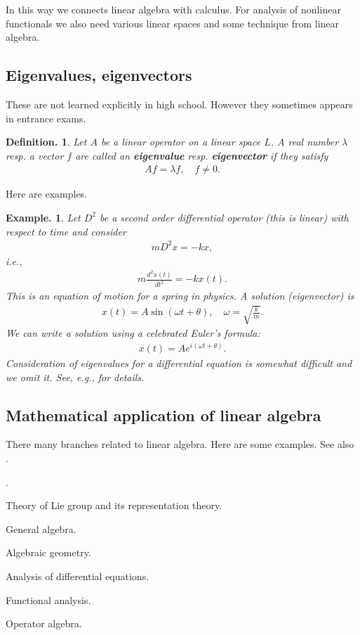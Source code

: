 \documentclass[openany, a4paper, oneside]{jsbook}
\newcounter{enum2}
\renewenvironment{enumerate}{%
\begin{list}%
{%
\arabic{enum2}.\ \,%
}%
{%
\usecounter{enum2}
\setlength{\itemindent}{0pt}%
\setlength{\leftmargin}{15pt}%
\setlength{\rightmargin}{0pt}%
\setlength{\labelsep}{0pt}%
\setlength{\labelwidth}{6pt}%
\setlength{\itemsep}{0pt}%
\setlength{\parsep}{0pt}%
\setlength{\listparindent}{0pt}%
}
}{%
\end{list}%
}
\theoremstyle{break}
\theoremstyle{breakdefn}
\newtheorem{defn}[thm]{Definition.}
\newtheorem{ex}[thm]{Example.}
\newcommand{\rbk}[1]{\left (#1\right)}
\newcommand{\upbf}[1]{\textup{\textbf{#1}}}
\begin{document}
In this way we connects linear algebra with calculus.
For analysis of nonlinear functionals we also need various linear spaces and
some technique from linear algebra.
\subsection{Eigenvalues, eigenvectors}


These are not learned explicitly in high school.
However they sometimes appears in entrance exams.
\begin{defn}
 Let $A$ be a linear operator on a linear space $L$.
 A real number $\lambda$ resp. a vector $f$ are called an \upbf{eigenvalue} resp. \upbf{eigenvector}
 if they satisfy
 \begin{align}
  A f = \lambda f, \quad
  f \neq 0.
 \end{align}
\end{defn}
Here are examples.
\begin{ex}
 Let $D^2$ be a second order differential operator (this is linear) with respect to time and consider
  \begin{align}
   m D^2 x
   =
   -k x,
  \end{align}
 i.e.,
  \begin{align}
   m \frac{d^2 x (t)}{dt^2}
   =
   -k x(t).
  \end{align}
 This is an equation of motion for a spring in physics.
 A solution (eigenvector) is
  \begin{align}
   x(t)
   =
   A \sin \rbk{\omega t + \theta}, \quad
   \omega
   =
   \sqrt{\frac{k}{m}}.
  \end{align}
 We can write a solution using a celebrated Euler's formula:
  \begin{align}
   x(t)
   =
   A e^{i \rbk{\omega t + \theta}}.
  \end{align}
 Consideration of eigenvalues for a differential equation is somewhat difficult and we omit it.
 See, e.g., \cite{HaimBrezis1, HaimBrezis2} for details.
\end{ex}
\subsection{Mathematical application of linear algebra}


There many branches related to linear algebra.
Here are some examples.
See also \cite{phasetr2}.
\begin{enumerate}
\item Theory of Lie group and its representation theory.
\item General algebra.
\item Algebraic geometry.
\item Analysis of differential equations.
\item Functional analysis.
\item Operator algebra.
\end{enumerate}
\end{document}
